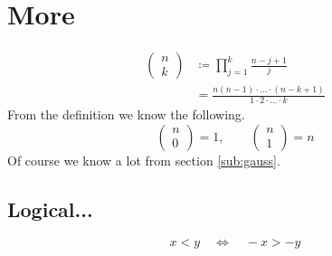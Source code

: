 \documentclass[fleqn,a4paper]{article}
\begin{document}
  \section{More}
    \begin{align}
      \begin{pmatrix}
        n \\
        k
      \end{pmatrix}
      &\coloneqq
      \prod_{j=1}^k \frac{n-j+1}{j} \\
      &= \frac{n(n-1)\cdot\ldots\cdot(n-k+1)}{1\cdot 2\cdot \ldots \cdot k}
    \end{align}
    From the definition we know the following.
    \begin{equation}
      \begin{pmatrix}
        n \\ 0
      \end{pmatrix}
      = 1,\qquad
      \begin{pmatrix}
        n \\ 1
      \end{pmatrix}
      = n
    \end{equation}
    Of course we know a lot from section \ref{sub:gauss}.

  \subsection{Logical...}
    \[
      x < y \quad \iff \quad -x > -y
    \]
\end{document}
